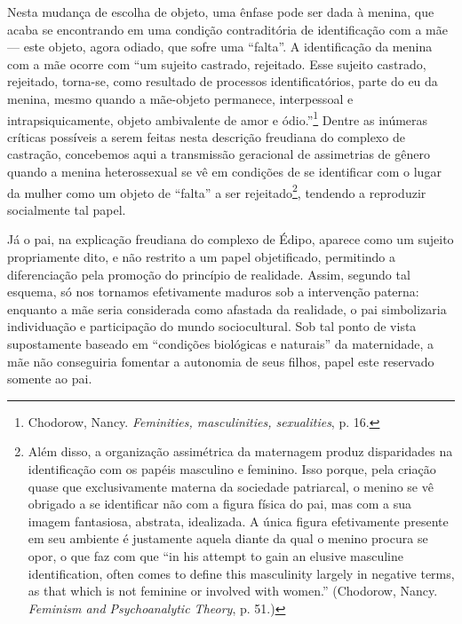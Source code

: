 Nesta mudança de escolha de objeto, uma ênfase pode ser dada à menina,
que acaba se encontrando em uma condição contraditória de identificação
com a mãe --- este objeto, agora odiado, que sofre uma ``falta''. A
identificação da menina com a mãe ocorre com ``um sujeito castrado,
rejeitado. Esse sujeito castrado, rejeitado, torna-se, como resultado de
processos identificatórios, parte do eu da menina, mesmo quando a
mãe-objeto permanece, interpessoal e intrapsiquicamente, objeto
ambivalente de amor e ódio.''\footnote{Chodorow, Nancy.
  \emph{Feminities, masculinities, sexualities}, p. 16.} Dentre as
inúmeras críticas possíveis a serem feitas nesta descrição freudiana do
complexo de castração, concebemos aqui a transmissão geracional de
assimetrias de gênero quando a menina heterossexual se vê em condições
de se identificar com o lugar da mulher como um objeto de ``falta'' a
ser rejeitado\footnote{Além disso, a organização assimétrica da
  maternagem produz disparidades na identificação com os papéis
  masculino e feminino. Isso porque, pela criação quase que
  exclusivamente materna da sociedade patriarcal, o menino se vê
  obrigado a se identificar não com a figura física do pai, mas com a
  sua imagem fantasiosa, abstrata, idealizada. A única figura
  efetivamente presente em seu ambiente é justamente aquela diante da
  qual o menino procura se opor, o que faz com que ``in his attempt to
  gain an elusive masculine identification, often comes to define this
  masculinity largely in negative terms, as that which is not feminine
  or involved with women.'' (Chodorow, Nancy. \emph{Feminism and
  Psychoanalytic Theory}, p. 51.)}, tendendo a reproduzir socialmente
tal papel.

Já o pai, na explicação freudiana do complexo de Édipo, aparece como um
sujeito propriamente dito, e não restrito a um papel objetificado,
permitindo a diferenciação pela promoção do princípio de realidade.
Assim, segundo tal esquema, só nos tornamos efetivamente maduros sob a
intervenção paterna: enquanto a mãe seria considerada como afastada da
realidade, o pai simbolizaria individuação e participação do mundo
sociocultural. Sob tal ponto de vista supostamente baseado em
``condições biológicas e naturais'' da maternidade, a mãe não
conseguiria fomentar a autonomia de seus filhos, papel este reservado
somente ao pai.

